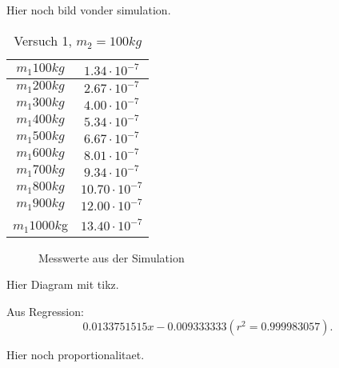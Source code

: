 

Hier noch bild vonder simulation.


\begin{table}[htbp]
    \centering
    \begin{tabular}{c|c}
        \toprule
        $m_1 100kg$ & $1.34\cdot 10^{-7}$ \\ 
        \midrule
        $m_1 200kg$ & $2.67\cdot 10^{-7}$ \\ 
        \midrule
        $m_1 300kg$ & $4.00\cdot 10^{-7}$ \\ 
        \midrule
        $m_1 400kg$ & $5.34\cdot 10^{-7}$  \\ 
        \midrule
        $m_1 500kg$ & $6.67\cdot 10^{-7}$  \\ 
        \midrule
        $m_1 600kg$ & $8.01\cdot 10^{-7}$  \\ 
        \midrule
        $m_1 700kg$ & $9.34\cdot 10^{-7}$  \\ 
        \midrule
        $m_1 800kg$ & $10.70\cdot 10^{-7}$  \\ 
        \midrule
        $m_1 900kg$ & $12.00\cdot 10^{-7}$  \\ 
        \midrule
        $m_1 1000k$g & $13.40\cdot 10^{-7}$  \\ 
        \bottomrule
    \end{tabular}
    \caption{Versuch 1, $m_2 = 100kg$}
\end{table}

\begin{figure}[htbp]
    \centering
{}
\caption{Messwerte aus der Simulation}
\end{figure}

Hier Diagram mit tikz.

Aus Regression: \[
0.0133751515 x -0.009333333 \left( r^2 = 0.999983057 \right) 
.\] 

Hier noch proportionalitaet.


